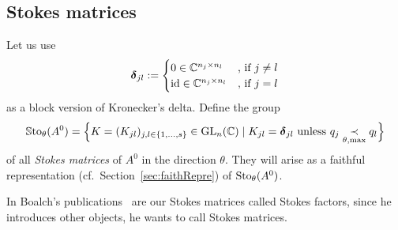 \subsection{Stokes matrices}\label{sec:matrixReps}
\begin{defn}\label{defn:groupOfFaithfullReps}
  Let us use
  \[
    \boldsymbol{\delta}_{jl}:=
    \begin{cases}
      0 \in \mathbb{C}^{n_j\times n_l} & \text{,~if~} j\neq l
    \\\operatorname{id} \in \mathbb{C}^{n_j\times n_l} & \text{,~if~} j=l
    \end{cases}
  \]
  as a block version of Kronecker's delta.
  Define the group
  \begin{align*}
    \operatorname{\mathbb{S}to}_\theta(A^0)= \Big\{K=(K_{jl})_{j,l\in\{1,\dots,s\}}\in\operatorname{GL}_n(\mathbb{C}) \mid
      K_{jl}=\boldsymbol{\delta}_{jl} \text{~unless~}
      q_j \underset{\theta,\max}{\prec} q_l \Big\}
  \end{align*}
  of all \emph{Stokes matrices} of $A^0$ in the direction $\theta$.
  They will arise as a faithful representation
  (cf.\ Section~\ref{sec:faithRepre}) of $\operatorname{Sto}_\theta(A^0)$.
  \begin{s-rem}
    In Boalch's publications~\cite{boalch,thboalch} are our Stokes matrices
    called Stokes factors, since he introduces other objects, he wants to call
    Stokes matrices.
  \end{s-rem}
\iffalse

\end{defn}
